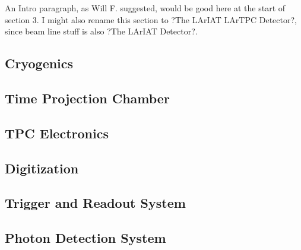 An Intro paragraph, as Will F. suggested, would be good here at the start of section 3. I might also rename this section to ?The LArIAT LArTPC Detector?, since beam line stuff is also ?The LArIAT Detector?.


\subsection{Cryogenics}\label{sec:Cryo}


\subsection{Time Projection Chamber}\label{sec:TPC}


\subsection{TPC Electronics}\label{sec:MSUElectronics}


\subsection{Digitization}\label{sec:Digitization}


\subsection{Trigger and Readout System}\label{sec:Trigger}


\subsection{Photon Detection System}\label{sec:PhotonSystem}



